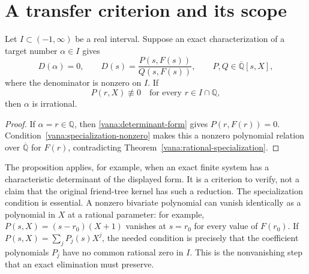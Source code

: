 \section{A transfer criterion and its scope}
\label{vana:transfer-section}

\begin{proposition}
\label{vana:transfer}
Let $I\subset(-1,\infty)$ be a real interval.  Suppose an exact
characterization of a target number $\alpha\in I$ gives
\begin{equation}\label{vana:determinant-form}
 D(\alpha)=0,\qquad
 D(s)=\frac{P(s,F(s))}{Q(s,F(s))},
 \qquad P,Q\in\overline{\mathbb Q}[s,X],
\end{equation}
where the denominator is nonzero on $I$.  If
\begin{equation}\label{vana:specialization-nonzero}
 P(r,X)\not\equiv0
 \quad\text{for every }r\in I\cap\mathbb Q,
\end{equation}
then $\alpha$ is irrational.
\end{proposition}

\begin{proof}
If $\alpha=r\in\mathbb Q$, then
\eqref{vana:determinant-form} gives $P(r,F(r))=0$.
Condition~\eqref{vana:specialization-nonzero} makes this a nonzero
polynomial relation over $\overline{\mathbb Q}$ for $F(r)$,
contradicting Theorem~\ref{vana:rational-specialization}.
\end{proof}

The proposition applies, for example, when an exact finite system
has a characteristic determinant of the displayed form.  It is a
criterion to verify, not a claim that the original friend-tree
kernel has such a reduction.  The specialization condition is
essential.  A nonzero bivariate polynomial can vanish identically
as a polynomial in $X$ at a rational parameter: for example,
$P(s,X)=(s-r_0)(X+1)$ vanishes at $s=r_0$ for every value of
$F(r_0)$.  If $P(s,X)=\sum_jP_j(s)X^j$, the needed condition is
precisely that the coefficient polynomials $P_j$ have no common
rational zero in $I$.  This is the nonvanishing step that an exact
elimination must preserve.

